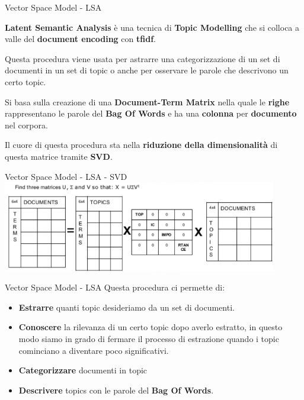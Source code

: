 \documentclass[british]{beamer}
\begin{document}
\begin{frame}{Vector Space Model - LSA}
	
	\textbf{Latent Semantic Analysis} \`{e} una tecnica di \textbf{Topic Modelling} che si colloca a valle del \textbf{document encoding} con \textbf{tfidf}. 
	
	Questa procedura viene usata per astrarre una categorizzazione di un \alert{set di documenti} in un \alert{set di topic} o anche per osservare le parole che descrivono un certo topic.
	
	Si basa sulla creazione di una \textbf{Document-Term Matrix} nella quale le \textbf{righe} rappresentano le parole del \textbf{Bag Of Words} e ha una \textbf{colonna} per \textbf{documento} nel corpora.
	
	Il cuore di questa procedura sta nella \textbf{riduzione della dimensionalit\`{a}} di questa matrice tramite \textbf{SVD}.
	
\end{frame}

\begin{frame}{Vector Space Model - LSA - SVD}
	\includegraphics[width=0.9\textwidth, height=0.4\textheight]{./Imgs/LSA1}
\end{frame}

\begin{frame}{Vector Space Model - LSA}
	Questa procedura ci permette di:
	\begin{itemize}
		\item \textbf{Estrarre} quanti topic desideriamo da un set di documenti.
		\item \textbf{Conoscere} la rilevanza di un certo topic dopo averlo estratto, in questo modo siamo in grado di fermare il processo di estrazione quando i topic cominciano a diventare poco significativi.
		\item \textbf{Categorizzare} documenti in topic
		\item \textbf{Descrivere} topics con le parole del \textbf{Bag Of Words}.
	\end{itemize}
\end{frame}
\end{document}

